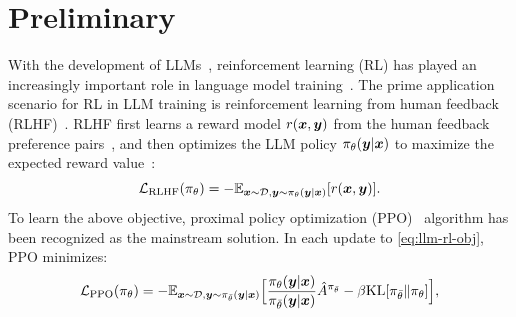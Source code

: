\documentclass{article}
\theoremstyle{plain}
\theoremstyle{definition}
\theoremstyle{remark}
\begin{document}



\vspace{-2mm}
\section{Preliminary}
\vspace{-2mm}
With the development of LLMs~\citep{chatgpt,openai2022gpt4}, reinforcement learning (RL) has played an
increasingly
important role in language model training~\citep{ouyang2022training,ramamurthy2022reinforcement}. The prime application scenario for RL in LLM training is reinforcement learning from human feedback (RLHF)~\citep{yuan2023rrhf,cheng2023adversarial,zeng2023diverse}. RLHF first learns a reward model $r({\bm{x}},{\bm{y}})$ from the human feedback preference pairs~\citep{cheng2023everyone}, and then optimizes the LLM policy $\pi_\theta({\bm{y}}|{\bm{x}})$ to maximize the expected reward value~\citep{dong2023raft}:
\begin{equation}
\gL_\text{RLHF}(\pi_\theta) = -\bbE_{\vx \sim \gD, \vy \sim \pi_\theta(\vy|\vx)} [r(\vx, \vy)]  %
     \label{eq:llm-rl-obj}.
\end{equation}
To learn the above objective, proximal policy optimization (PPO)~\citep{schulman2017proximal} algorithm has been recognized as the mainstream solution. In each update to \eqref{eq:llm-rl-obj}, PPO minimizes:
\begin{equation}
 {\mathcal{L}}_\text{PPO}(\pi_\theta) =  -  {\mathbb{E}}_{{\bm{x}}\sim {\mathcal{D}},{\bm{y}}\sim \pi_{\bar{\theta}}({\bm{y}}|{\bm{x}})}\Big[\frac{\pi_{\theta}({\bm{y}}|{\bm{x}})}{\pi_{\bar{\theta}}({\bm{y}}|{\bm{x}})} \hat{A}^{\pi_{\bar{\theta}}} - \beta \text{KL}[\pi_{\bar{\theta}} \Vert \pi_{\theta}] \Big], 
\end{equation}
\end{document}
